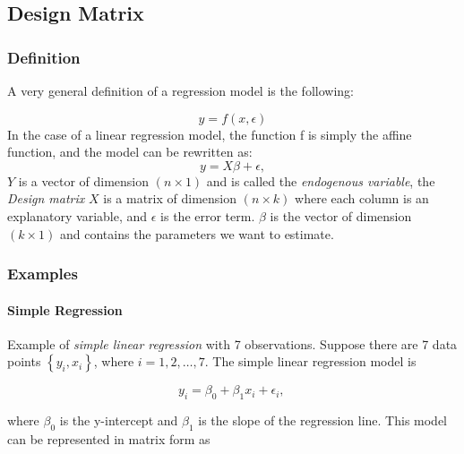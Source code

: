 \subsection{Design Matrix}

\subsubsection{Definition}
A very general definition of a regression model is the following:

\begin{equation}
  y =f(x,\epsilon)
\end{equation}
In the case of a linear regression model, the function f is simply the affine function, and the model can be rewritten as:
\begin{equation}
    y=X\beta+ \epsilon,
\end{equation}
$Y$ is a vector of dimension $(n \times 1)$ and is called the \emph{endogenous variable}, the \emph{Design matrix} $X$ is a matrix of dimension $(n \times k)$ where each column is an explanatory variable, and $\epsilon$ is the error term. $\beta$ is the vector of dimension $(k \times 1)$ and contains the parameters we want to estimate.

\subsubsection{Examples}
\paragraph{Simple Regression}
Example of \emph{simple linear regression} with 7 observations.
Suppose there are 7 data points $\left\{ {{y_i},{x_i}} \right\}$, where $i=1,2,…,7$. The simple linear regression model is

\begin{equation}
  y_i = \beta_0 + \beta_1 x_i +\epsilon_i, \,
\end{equation}

where $\beta_0$ is the y-intercept and $\beta_1$ is the slope of the regression line. This model can be represented in matrix form as

